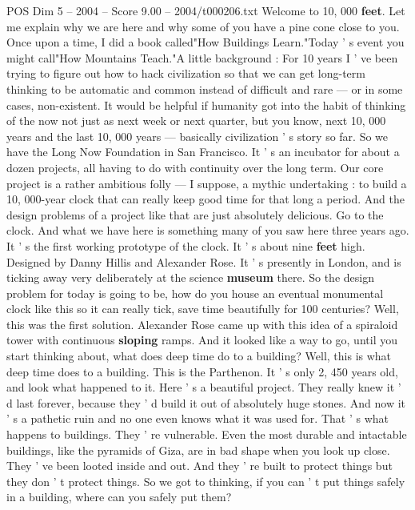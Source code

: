 \begin{textsample}{POS Dim 5 – 2004 – Score 9.00 – 2004/t000206.txt}  \label{ex:f5_pos_016}
Welcome to 10, 000 \textbf{feet}.
Let me explain why we are here and why some of you have a pine cone close to you.
Once upon a time, I did a book called"How Buildings Learn."Today ' s event you might call"How Mountains Teach."A little background : For 10 years I ' ve been trying to figure out how to hack civilization so that we can get long-term thinking to be automatic and common instead of difficult and rare — or in some cases, non-existent.
It would be helpful if humanity got into the habit of thinking of the now not just as next week or next quarter, but you know, next 10, 000 years and the last 10, 000 years — basically civilization ' s story so far.
So we have the Long Now Foundation in San Francisco.
It ' s an incubator for about a dozen projects, all having to do with continuity over the long term.
Our core project is a rather ambitious folly — I suppose, a mythic undertaking : to build a 10, 000-year clock that can really keep good time for that long a period.
And the design problems of a project like that are just absolutely delicious.
Go to the clock.
And what we have here is something many of you saw here three years ago.
It ' s the first working prototype of the clock.
It ' s about nine \textbf{feet} high.
Designed by Danny Hillis and Alexander Rose.
It ' s presently in London, and is ticking away very deliberately at the science \textbf{museum} there.
So the design problem for today is going to be, how do you house an eventual monumental clock like this so it can really tick, save time beautifully for 100 centuries?
Well, this was the first solution.
Alexander Rose came up with this idea of a spiraloid tower with continuous \textbf{sloping} ramps.
And it looked like a way to go, until you start thinking about, what does deep time do to a building?
Well, this is what deep time does to a building.
This is the Parthenon.
It ' s only 2, 450 years old, and look what happened to it.
Here ' s a beautiful project.
They really knew it ' d last forever, because they ' d build it out of absolutely huge stones.
And now it ' s a pathetic ruin and no one even knows what it was used for.
That ' s what happens to buildings.
They ' re vulnerable.
Even the most durable and intactable buildings, like the pyramids of Giza, are in bad shape when you look up close.
They ' ve been looted inside and out.
And they ' re built to protect things but they don ' t protect things.
So we got to thinking, if you can ' t put things safely in a building, where can you safely put them?

\end{textsample}
